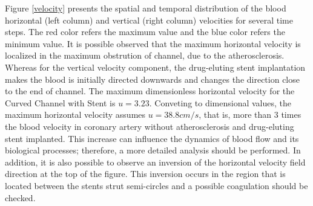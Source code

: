 \documentclass[10pt,fleqn,a4paper,twoside]{article}
\begin{document}
\smallskip
Figure \ref{velocity} presents the spatial and 
temporal distribution of the blood horizontal (left
column) and vertical (right column) velocities for
several time steps. The red color refers the maximum value and 
the blue color refers the minimum value.
It is possible observed that the maximum horizontal velocity is
localized in the maximum obstrution of channel,
due to the atherosclerosis. 
Whereas for the vertical velocity component, 
the drug-eluting stent implantation makes the blood is initially directed downwards and changes the direction close to the end
of channel.
The maximum dimensionless horizontal
velocity for the Curved Channel with Stent is 
$u=3.23$.
Conveting to dimensional values, the maximum horizontal
velocity assumes $u = 38.8 cm/s$, that is, 
more than 3 times the blood velocity in coronary 
artery without atherosclerosis and
drug-eluting stent implanted.
This increase can influence the dynamics of blood flow
and its biological processes; therefore, a more detailed analysis should be performed. In
addition, it is also possible to observe an inversion of the horizontal velocity field direction
at the top of the figure. This inversion occurs in the region that is located between the stents
strut semi-circles and a possible coagulation should be checked.
\end{document}

